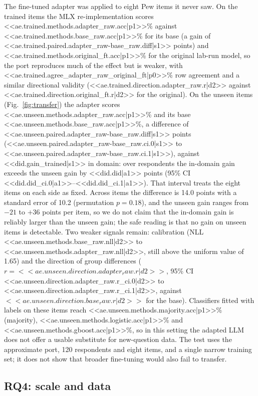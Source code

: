 \documentclass[conference]{IEEEtran}
\begin{document}
The fine-tuned adapter was applied to eight Pew items it never saw. On the trained items the MLX re-implementation scores <<ae.trained.methods.adapter_raw.acc|p1>>\% against <<ae.trained.methods.base_raw.acc|p1>>\% for its base (a gain of <<ae.trained.paired.adapter_raw-base_raw.diff|s1>> points) and <<ae.trained.methods.original_ft.acc|p1>>\% for the original lab-run model, so the port reproduces much of the effect but is weaker, with <<ae.trained.agree_adapter_raw_original_ft|p0>>\% row agreement and a similar directional validity (<<ae.trained.direction.adapter_raw.r|d2>> against <<ae.trained.direction.original_ft.r|d2>> for the original). On the unseen items (Fig.~\ref{fig:transfer}) the adapter scores <<ae.unseen.methods.adapter_raw.acc|p1>>\% and its base <<ae.unseen.methods.base_raw.acc|p1>>\%, a difference of <<ae.unseen.paired.adapter_raw-base_raw.diff|s1>> points (<<ae.unseen.paired.adapter_raw-base_raw.ci.0|s1>> to <<ae.unseen.paired.adapter_raw-base_raw.ci.1|s1>>), against <<did.gain_trained|s1>> in domain: over respondents the in-domain gain exceeds the unseen gain by <<did.did|a1>> points (95\% CI <<did.did_ci.0|a1>>--<<did.did_ci.1|a1>>). That interval treats the eight items on each side as fixed. Across items the difference is 14.0 points with a standard error of 10.2 (permutation $p=0.18$), and the unseen gain ranges from $-21$ to $+36$ points per item, so we do not claim that the in-domain gain is reliably larger than the unseen gain; the safe reading is that no gain on unseen items is detectable. Two weaker signals remain: calibration (NLL <<ae.unseen.methods.base_raw.nll|d2>> to <<ae.unseen.methods.adapter_raw.nll|d2>>, still above the uniform value of 1.65) and the direction of group differences ($r={<<ae.unseen.direction.adapter_raw.r|d2>>}$, 95\% CI <<ae.unseen.direction.adapter_raw.r_ci.0|d2>> to <<ae.unseen.direction.adapter_raw.r_ci.1|d2>>, against $<<ae.unseen.direction.base_raw.r|d2>>$ for the base). Classifiers fitted with labels on these items reach <<ae.unseen.methods.majority.acc|p1>>\% (majority), <<ae.unseen.methods.logistic.acc|p1>>\% and <<ae.unseen.methods.gboost.acc|p1>>\%, so in this setting the adapted LLM does not offer a usable substitute for new-question data. The test uses the approximate port, 120 respondents and eight items, and a single narrow training set; it does not show that broader fine-tuning would also fail to transfer.

\subsection{RQ4: scale and data}
\end{document}
